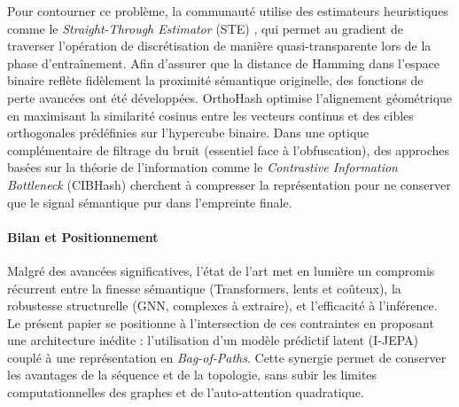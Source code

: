 Pour contourner ce problème, la communauté utilise des estimateurs heuristiques comme le \textit{Straight-Through Estimator} (STE) \cite{bengio2013ste}, qui permet au gradient de traverser l'opération de discrétisation de manière quasi-transparente lors de la phase d'entraînement.
Afin d'assurer que la distance de Hamming dans l'espace binaire reflète fidèlement la proximité sémantique originelle, des fonctions de perte avancées ont été développées.
OrthoHash \cite{ji2021orthohash} optimise l'alignement géométrique en maximisant la similarité cosinus entre les vecteurs continus et des cibles orthogonales prédéfinies sur l'hypercube binaire.
Dans une optique complémentaire de filtrage du bruit (essentiel face à l'obfuscation), des approches basées sur la théorie de l'information comme le \textit{Contrastive Information Bottleneck} (CIBHash) \cite{qiu2021cibhash} cherchent à compresser la représentation pour ne conserver que le signal sémantique pur dans l'empreinte finale.

\vspace{1em}
\paragraph{Bilan et Positionnement} 
Malgré des avancées significatives, l'état de l'art met en lumière un compromis récurrent entre la finesse sémantique (Transformers, lents et coûteux), la robustesse structurelle (GNN, complexes à extraire), et l'efficacité à l'inférence.
Le présent papier se positionne à l'intersection de ces contraintes en proposant une architecture inédite : l'utilisation d'un modèle prédictif latent (I-JEPA) couplé à une représentation en \textit{Bag-of-Paths}.
Cette synergie permet de conserver les avantages de la séquence et de la topologie, sans subir les limites computationnelles des graphes et de l'auto-attention quadratique.


